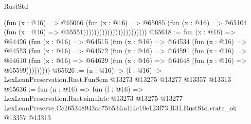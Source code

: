 \begin{lexlean}{RustStd}
\begin{coremodule}
                                            (fun (x : @16) =>
                                            @65066
                                              (fun (x : @16) =>
                                              @65085
                                                (fun (x : @16) =>
                                                @65104
                                                  (fun (x : @16) => @65551))))))))))))))))))))))))
@65618 := fun (x : @16) =>
  @64496
    (fun (x : @16) =>
    @64515
      (fun (x : @16) =>
      @64534
        (fun (x : @16) =>
        @64553
          (fun (x : @16) =>
          @64572
            (fun (x : @16) =>
            @64591
              (fun (x : @16) =>
              @64610
                (fun (x : @16) => @64629 (fun (x : @16) => @64648 (fun (x : @16) => @65599)))))))))
@65626 := (n : @16) ->
  (f : @16) -> LexLeanPreservation.Rust.FunSem @13273 @13275 @13277 @13357 @13313
@65636 := fun (n : @16) =>
  fun (f : @16) =>
  LexLeanPreservation.Rust.simulate
    @13273
    @13275
    @13277
    LexLeanPreserve.Cc265348943ac75b534ad14c10e123f73.R31.RustStd.crate_ok
    @13357
    @13313
\end{coremodule}
\end{lexlean}
